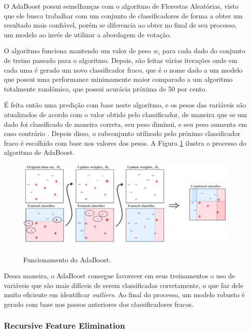 O AdaBoost possui semelhanças com o algoritmo de Florestas Aleatórias, visto que ele busca trabalhar com um conjunto de classificadores de forma a obter um resultado mais confiável, porém se diferencia ao obter no final de seu processo, um modelo ao invés de utilizar a abordagem de votação.

O algoritmo funciona mantendo um valor de peso $w_{i}$ para cada dado do conjunto de treino passado para o algoritmo. Depois, são feitas várias iterações onde em cada uma é gerado um novo classificador fraco, que é o nome dado a um modelo que possui uma performance minimamente maior comparado a um algoritmo totalmente randômico, que possui acurácia próxima de 50 por cento.

É feita então uma predição com base neste algoritmo, e os pesos das variáveis são atualizados de acordo com o valor obtido pelo classificador, de maneira que se um dado foi classificado de maneira correta, seu peso diminui, e seu peso aumenta em caso contrário \cite{rojas2009adaboost}. Depois disso, o subconjunto utilizado pelo próximo classificador fraco é escolhido com base nos valores dos pesos. A Figura \ref{f.adaboost} ilustra o processo do algoritmo de AdaBoost.

\begin{figure}[h]
\caption{\small Funcionamento do AdaBoost.}
\centering
\includegraphics[scale=1.4]{figs/adaboost.png}
\label{f.adaboost}
\end{figure}

Dessa maneira, o AdaBoost consegue favorecer em seus treinamentos o uso de variáveis que são mais difíceis de serem classificadas corretamente, o que faz dele muito eficiente em identificar \textit{outliers}. Ao final do processo, um modelo robusto é gerado com base nos passos anteriores dos classificadores fracos.

\subsubsection{Recursive Feature Elimination}

